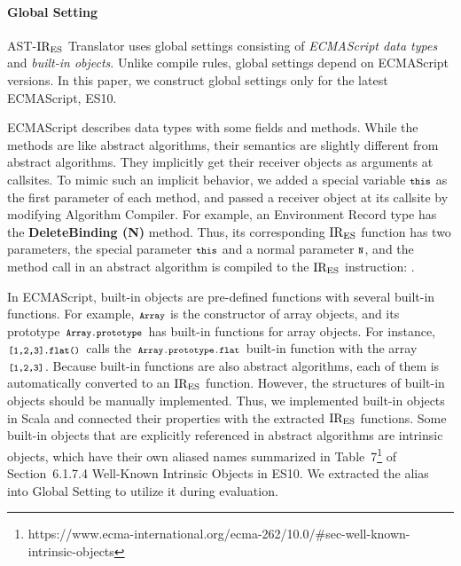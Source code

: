 \paragraph{Global Setting}
{\sf AST-\( \text{IR}_\text{ES} \) Translator} uses global settings consisting
of \textit{ECMAScript data types} and \textit{built-in objects}.
Unlike compile rules, global settings depend on
ECMAScript versions. In this paper, we construct global settings only for the
latest ECMAScript, ES10.

ECMAScript describes data types with some fields and methods.
While the methods are like abstract algorithms, their semantics are
slightly different from abstract algorithms. They implicitly get their receiver objects as
arguments at callsites.  To mimic such an implicit behavior, we added a special
variable \( \texttt{\footnotesize this} \) as the first parameter of each method, and passed a
receiver object at its callsite by modifying \textsf{Algorithm Compiler}.  For
example, an Environment Record type has the \textbf{DeleteBinding (N)} method.
Thus, its corresponding \( \text{IR}_\text{ES} \) function has two parameters, the special
parameter \( \texttt{\footnotesize this} \) and a normal parameter \( \texttt{\footnotesize N} \), and the method call
in an abstract algorithm is compiled to the \( \text{IR}_\text{ES} \) instruction:
.

In ECMAScript, built-in objects are pre-defined functions with several
built-in functions.  For example, \( \texttt{\footnotesize Array} \)
is the constructor of array objects, and its prototype
\( \texttt{\footnotesize Array.prototype} \) has built-in functions for array objects.
For instance, \( \texttt{\footnotesize[1,2,3].flat()} \) calls the
\( \texttt{\footnotesize Array.prototype.flat} \) built-in function with the array
\( \texttt{\footnotesize[1,2,3]} \).  Because built-in functions are also abstract
algorithms, each of them is automatically converted to an \( \text{IR}_\text{ES} \)
function.  However, the structures of built-in objects should be
manually implemented.  Thus, we implemented built-in objects in Scala
and connected their properties with the extracted \( \text{IR}_\text{ES} \) functions.
%
Some built-in objects that are explicitly referenced in abstract
algorithms are intrinsic objects, which have their own
aliased names summarized in
Table~7\footnote{https://www.ecma-international.org/ecma-262/10.0/\#sec-well-known-intrinsic-objects} of Section~6.1.7.4
\textsf{Well-Known Intrinsic Objects} in ES10.  We extracted the alias
into \textsf{Global Setting} to utilize it during evaluation.
